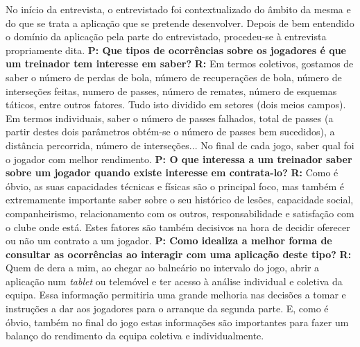 No início da entrevista, o entrevistado foi contextualizado do âmbito da mesma e do que se trata a aplicação que se pretende desenvolver. Depois de bem entendido o domínio da aplicação pela parte do entrevistado, procedeu-se à entrevista propriamente dita.
\vspace{5mm}
\newline\textbf{P: Que tipos de ocorrências sobre os jogadores é que um treinador tem interesse em saber?}
\vspace{2mm}
\newline\textbf{R:} Em termos coletivos, gostamos de saber o número de perdas de bola, número de recuperações de bola, número de interseções feitas, numero de passes, número de remates, número de esquemas táticos, entre outros fatores. Tudo isto dividido em setores (dois meios campos). Em termos individuais, saber o número de passes falhados, total de passes (a partir destes dois parâmetros obtém-se o número de passes bem sucedidos), a  distância percorrida, número de interseções... No final de cada jogo, saber qual foi o jogador com melhor rendimento.
\vspace{2mm}
\newline\textbf{P: O que interessa a um treinador saber sobre um jogador quando existe interesse em contrata-lo?}
\vspace{2mm}
\newline\textbf{R:} Como é óbvio, as suas capacidades técnicas e físicas são o principal foco, mas também é extremamente importante saber sobre o seu histórico de lesões, capacidade social, companheirismo, relacionamento com os outros, responsabilidade e satisfação com o clube onde está. Estes fatores são também decisivos na hora de decidir oferecer ou não um contrato a um jogador.
\vspace{2mm}
\newline\textbf{P: Como idealiza a melhor forma de consultar as ocorrências ao interagir com uma aplicação deste tipo?}
\vspace{2mm}
\newline\textbf{R:} Quem de dera a mim, ao chegar ao balneário no intervalo do jogo, abrir a aplicação num \emph{tablet} ou telemóvel e ter acesso à análise individual e coletiva da equipa. Essa informação permitiria uma grande melhoria nas decisões a tomar e instruções a dar aos jogadores para o arranque da segunda parte. E, como é óbvio, também no final do jogo estas informações são importantes para fazer um balanço do rendimento da equipa coletiva e individualmente.
\vspace{2mm}
